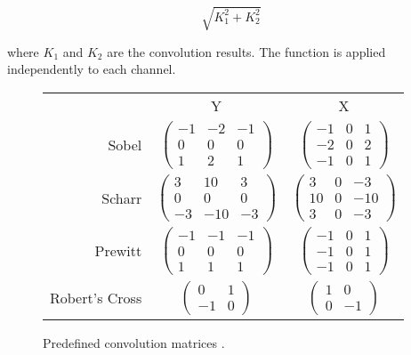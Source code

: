 \documentclass[12pt]{report}
\begin{document}
\[\sqrt{K_1^2+K_2^2}\]

where $K_1$ and $K_2$ are the convolution results. The function is
applied independently to each channel.

\begin{figure}[H]
\begin{mdframed}[style=default]
\begin{tabular}{rcc}
& Y & X \\
Sobel &
$\begin{pmatrix} -1 & -2 & -1 \\ 0 & 0 & 0 \\ 1 & 2 & 1 \end{pmatrix}$&
$\begin{pmatrix} -1 & 0 & 1 \\ -2 & 0 & 2 \\ -1 & 0 & 1 \end{pmatrix}$\\
Scharr &
$\begin{pmatrix} 3 & 10 & 3 \\ 0 & 0 & 0 \\ -3 & -10 & -3 \end{pmatrix}$&
$\begin{pmatrix} 3 & 0 & -3 \\ 10 & 0 & -10 \\ 3 & 0 & -3 \end{pmatrix}$\\
Prewitt&
$\begin{pmatrix} -1 & -1 & -1 \\ 0 & 0 & 0 \\ 1 & 1 & 1 \end{pmatrix}$&
$\begin{pmatrix} -1 & 0 & 1 \\ -1 & 0 & 1 \\ -1 & 0 & 1 \end{pmatrix}$\\
Robert's Cross &
$\begin{pmatrix} 0 & 1 \\ -1 & 0 \end{pmatrix}$&
$\begin{pmatrix} 1 & 0 \\ 0 & -1 \end{pmatrix}$\\
\end{tabular}
\end{mdframed}
  \caption{Predefined convolution matrices \cite{HIPR2}\cite{wiki:Sobel}.}
\end{figure}
\end{document}
